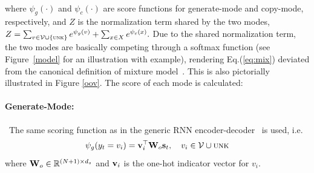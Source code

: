 \vspace{-5pt}
\\
where $\psi_g(\cdot)$ and $\psi_c(\cdot)$ are score functions for generate-mode and copy-mode, respectively, and $Z$ is the normalization term shared by the two modes, $Z = \sum_{v\in \cal V \cup \{\textsc{unk}\}}e^{\psi_g(v)} + \sum_{x\in X}e^{\psi_c(x)}.$
Due to the shared normalization term, the two modes are basically competing through a softmax function (see Figure~\ref{model} for an illustration with example), rendering Eq.(\ref{eq:mix}) deviated from the canonical definition of mixture model~\cite{GaussianMixture}. This is also pictorially illustrated in Figure \ref{oov}. 
 The score of each mode is calculated:\vspace{-5pt}
\paragraph{Generate-Mode:}~The same scoring function as in the generic RNN encoder-decoder~\cite{bahdanau2014neural} is used, i.e.
\begin{equation}\label{eq:gen}
	\psi_g(y_t=v_i) = \mathbf{v}_i^\top \mathbf{W}_o \mathbf{s}_t, \quad v_i \in \mathcal{V} \cup \textsc{unk}
\end{equation}
where $\mathbf{W}_o \in \mathbb{R}^{(N+1) \times d_s}$ and $ \mathbf{v}_i$ is the one-hot indicator vector for $v_i$. %

